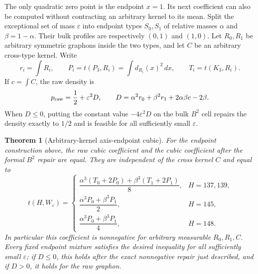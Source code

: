 \documentclass[11pt]{article}
\newtheorem{theorem}{Theorem}[section]
\begin{document}
The only quadratic zero point is the endpoint $x=1$.  Its next coefficient
can also be computed without contracting an arbitrary kernel to its mean.
Split the exceptional set of mass $\varepsilon$ into endpoint types
$S_0,S_1$ of relative masses $\alpha$ and
$\beta=1-\alpha$.  Their bulk profiles are respectively $(0,1)$ and
$(1,0)$.  Let $R_0,R_1$ be arbitrary symmetric graphons inside the two
types, and let $C$ be an arbitrary cross-type kernel.  Write
\[
 r_i=\int R_i,\qquad
 P_i=t(P_3,R_i)=\int d_{R_i}(x)^2\,dx,
 \qquad T_i=t(K_3,R_i).
\]
If $c=\int C$, the raw density is
\begin{equation}
 p_{\rm raw}=\frac12+\varepsilon^2D,
 \qquad
 D=\alpha^2r_0+\beta^2r_1+2\alpha\beta c-2\beta.
 \label{eq:axis-endpoint-density}
\end{equation}
When $D\leq0$, putting the constant value
$-4\varepsilon^2D$ on the bulk $B^2$ cell repairs the density exactly to
$1/2$ and is feasible for all sufficiently small $\varepsilon$.

\begin{theorem}[Arbitrary-kernel axis-endpoint cubic]
\label{thm:axis-endpoint-cubic}
For the endpoint construction above, the raw cubic coefficient and the
cubic coefficient after the formal $B^2$ repair are equal.  They are
independent of the cross kernel $C$ and equal to
\begin{equation}
 [\varepsilon^3]\,t(H,W_\varepsilon)=
 \begin{cases}
 \dfrac{\alpha^3(T_0+2P_0)+\beta^3(T_1+2P_1)}8,
      &H=137,139,\\[6pt]
 \dfrac{\alpha^3P_0+\beta^3P_1}{2},&H=145,\\[6pt]
 \dfrac{\alpha^3P_0+\beta^3P_1}{4},&H=148.
 \end{cases}
 \label{eq:axis-endpoint-cubic}
\end{equation}
In particular this coefficient is nonnegative for arbitrary measurable
$R_0,R_1,C$.  Every fixed endpoint mixture satisfies the desired inequality
for all sufficiently small $\varepsilon$; if $D\leq0$, this holds after the
exact nonnegative repair just described, and if $D>0$, it holds for the raw
graphon.
\end{theorem}
\end{document}
